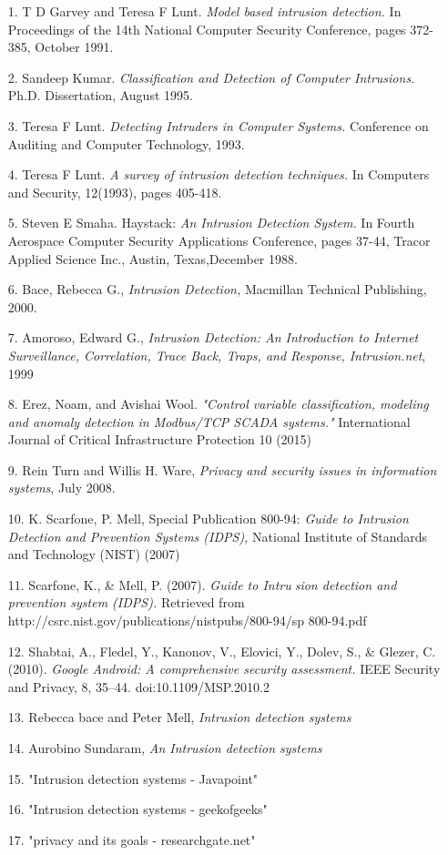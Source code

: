 \documentclass[12pt]{article}
\begin{document}
    \begin{enumerate}
        \item[1.] T D Garvey and Teresa F Lunt. \textit{Model based intrusion detection.} In Proceedings of the 14th National Computer Security Conference, pages 372-385, October 1991.
        \item[2.] Sandeep Kumar. \textit{Classification and Detection of Computer Intrusions.} Ph.D. Dissertation, August 1995.
        \item[3.] Teresa F Lunt. \textit{Detecting Intruders in Computer Systems.} Conference on Auditing and Computer Technology, 1993.
        \item[4.] Teresa F Lunt. \textit{A survey of intrusion detection techniques.} In Computers and Security, 12(1993), pages 405-418.
        \item[5.] Steven E Smaha. Haystack: \textit{An Intrusion Detection System.} In Fourth Aerospace Computer Security Applications Conference, pages 37-44, Tracor Applied Science Inc., Austin, Texas,December 1988.
        \item[6.] Bace, Rebecca G., \textit{Intrusion Detection,} Macmillan Technical Publishing, 2000.
        \item[7.] Amoroso, Edward G., \textit{Intrusion Detection: An Introduction to Internet Surveillance, Correlation, Trace Back, Traps, and Response, Intrusion.net}, 1999
        \item[8.] Erez, Noam, and Avishai Wool. \textit{"Control variable classification, modeling and anomaly detection in Modbus/TCP SCADA systems."} International Journal of Critical Infrastructure Protection 10 (2015)
        \item[9.] Rein Turn and Willis H. Ware, \textit{Privacy and security issues in information systems}, July 2008.
        \item[10.] K. Scarfone, P. Mell, Special Publication 800-94: \textit{Guide to Intrusion Detection and Prevention Systems (IDPS),} National Institute of Standards and Technology (NIST) (2007)
        \item[11.] Scarfone, K., & Mell, P. (2007). \textit{Guide to Intrusion detection and prevention system (IDPS).} Retrieved from http://csrc.nist.gov/publications/nistpubs/800-94/sp 800-94.pdf
        \item[12.] Shabtai, A., Fledel, Y., Kanonov, V., Elovici, Y., Dolev, S., & Glezer, C. (2010).\textit{ Google Android: A comprehensive security assessment.} IEEE Security and Privacy, 8, 35–44. doi:10.1109/MSP.2010.2
        \item[13.] Rebecca bace and Peter Mell, \textit{Intrusion detection systems}
        \item[14.] Aurobino Sundaram, \textit{An Intrusion detection systems}
        \item[15.] "Intrusion detection systems - Javapoint"
        \item[16.] "Intrusion detection systems - geekofgeeks"
        \item[17.] "privacy and its goals - researchgate.net"
        
    \end{enumerate}
\end{document}
